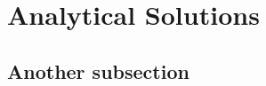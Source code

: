 \section{Analytical Solutions}\label{Analytical_Solutions}\thispagestyle{SectionFirstPage} %
\subsection{Another subsection}

